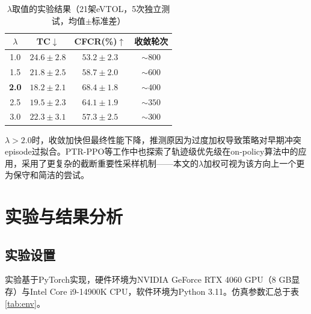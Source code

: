 \documentclass[12pt,a4paper,UTF8]{ctexart}
\begin{document}
\begin{table}[H]
    \centering
    \caption{$\lambda$取值的实验结果（21架eVTOL，5次独立测试，均值$\pm$标准差）}
    \label{tab:lambda}
    \begin{tabular}{|c|c|c|c|}
        \hline
        $\lambda$ & TC$\downarrow$ & CFCR(\%)$\uparrow$ & 收敛轮次 \\
        \hline
        1.0 & $24.6 \pm 2.8$ & $53.2 \pm 2.3$ & $\sim800$ \\
        1.5 & $21.8 \pm 2.5$ & $58.7 \pm 2.0$ & $\sim600$ \\
        \textbf{2.0} & $\mathbf{18.2 \pm 2.1}$ & $\mathbf{68.4 \pm 1.8}$ & $\sim400$ \\
        2.5 & $19.5 \pm 2.3$ & $64.1 \pm 1.9$ & $\sim350$ \\
        3.0 & $22.3 \pm 3.1$ & $57.3 \pm 2.5$ & $\sim300$ \\
        \hline
    \end{tabular}
\end{table}

$\lambda > 2.0$时，收敛加快但最终性能下降，推测原因为过度加权导致策略对早期冲突episode过拟合。PTR-PPO\cite{ref27}等工作中也探索了轨迹级优先级在on-policy算法中的应用，采用了更复杂的截断重要性采样机制——本文的$\lambda$加权可视为该方向上一个更为保守和简洁的尝试。

\section{实验与结果分析}

\subsection{实验设置}

实验基于PyTorch实现，硬件环境为NVIDIA GeForce RTX 4060 GPU（8 GB显存）与Intel Core i9-14900K CPU，软件环境为Python 3.11。仿真参数汇总于表\ref{tab:env}。
\end{document}
